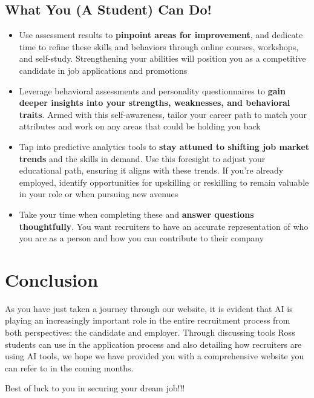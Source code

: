 \documentclass[
]{book}
\begin{document}
\hypertarget{what-you-a-student-can-do-4}{%
\section{What You (A Student) Can Do!}\label{what-you-a-student-can-do-4}}

\begin{itemize}
\item
  Use assessment results to \textbf{pinpoint areas for improvement}, and dedicate time to refine these skills and behaviors through online courses, workshops, and self-study. Strengthening your abilities will position you as a competitive candidate in job applications and promotions
\item
  Leverage behavioral assessments and personality questionnaires to \textbf{gain deeper insights into your strengths, weaknesses, and behavioral traits}. Armed with this self-awareness, tailor your career path to match your attributes and work on any areas that could be holding you back
\item
  Tap into predictive analytics tools to \textbf{stay attuned to shifting job market trends} and the skills in demand. Use this foresight to adjust your educational path, ensuring it aligns with these trends. If you're already employed, identify opportunities for upskilling or reskilling to remain valuable in your role or when pursuing new avenues
\item
  Take your time when completing these and \textbf{answer questions thoughtfully}. You want recruiters to have an accurate representation of who you are as a person and how you can contribute to their company
\end{itemize}

\hypertarget{conclusion}{%
\chapter{Conclusion}\label{conclusion}}

As you have just taken a journey through our website, it is evident that AI is playing an increasingly important role in the entire recruitment process from both perspectives: the candidate and employer. Through discussing tools Ross students can use in the application process and also detailing how recruiters are using AI tools, we hope we have provided you with a comprehensive website you can refer to in the coming months.~

Best of luck to you in securing your dream job!!!
\end{document}
